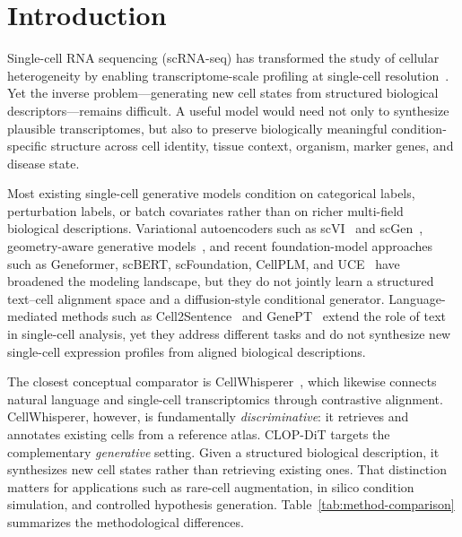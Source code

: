 \documentclass[11pt,a4paper]{article}
\begin{document}
\section{Introduction}

Single-cell RNA sequencing (scRNA-seq) has transformed the study of cellular heterogeneity by enabling transcriptome-scale profiling at single-cell resolution~\cite{ref-scrnaseq-review,ref-10x}. Yet the inverse problem---generating new cell states from structured biological descriptors---remains difficult. A useful model would need not only to synthesize plausible transcriptomes, but also to preserve biologically meaningful condition-specific structure across cell identity, tissue context, organism, marker genes, and disease state.

Most existing single-cell generative models condition on categorical labels, perturbation labels, or batch covariates rather than on richer multi-field biological descriptions. Variational autoencoders such as scVI~\cite{ref-scvi,ref-scvi-tools} and scGen~\cite{ref-scgen}, geometry-aware generative models~\cite{ref-scdiff}, and recent foundation-model approaches such as Geneformer, scBERT, scFoundation, CellPLM, and UCE~\cite{ref-geneformer,ref-scbert,ref-scfoundation,ref-cellplm,ref-uce} have broadened the modeling landscape, but they do not jointly learn a structured text--cell alignment space and a diffusion-style conditional generator. Language-mediated methods such as Cell2Sentence~\cite{ref-cell2sentence} and GenePT~\cite{ref-genept} extend the role of text in single-cell analysis, yet they address different tasks and do not synthesize new single-cell expression profiles from aligned biological descriptions.

The closest conceptual comparator is CellWhisperer~\cite{ref-cellwhisperer}, which likewise connects natural language and single-cell transcriptomics through contrastive alignment. CellWhisperer, however, is fundamentally \emph{discriminative}: it retrieves and annotates existing cells from a reference atlas. CLOP-DiT targets the complementary \emph{generative} setting. Given a structured biological description, it synthesizes new cell states rather than retrieving existing ones. That distinction matters for applications such as rare-cell augmentation, in silico condition simulation, and controlled hypothesis generation. Table~\ref{tab:method-comparison} summarizes the methodological differences.
\end{document}

